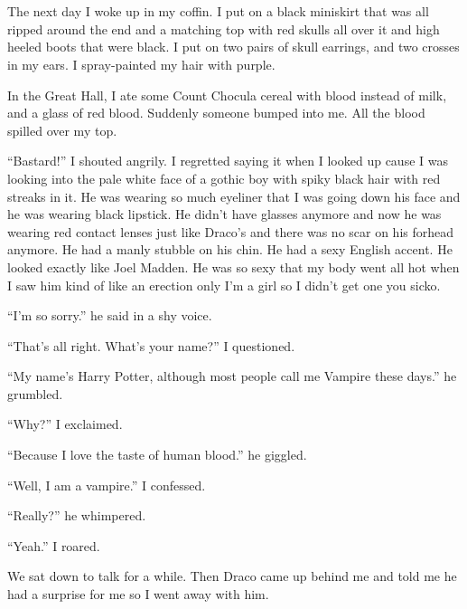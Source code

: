 \section{}



The next day I woke up in my coffin. I put on a black miniskirt that was all ripped around the end and a matching top with red skulls all over it and high heeled boots that were black. I put on two pairs of skull earrings, and two crosses in my ears. I spray-painted my hair with purple.

\begin{sloppypar}
    In the Great Hall, I ate some Count Chocula cereal with blood instead of milk, and a glass of red blood. Suddenly someone bumped into me. All the blood spilled over my top.
\end{sloppypar}

\enquote{Bastard!} I shouted angrily. I regretted saying it when I looked up cause I was looking into the pale white face of a gothic boy with spiky black hair with red streaks in it. He was wearing so much eyeliner that I was going down his face and he was wearing black lipstick. He didn't have glasses anymore and now he was wearing red contact lenses just like Draco's and there was no scar on his forhead anymore. He had a manly stubble on his chin. He had a sexy English accent. He looked exactly like Joel Madden. He was so sexy that my body went all hot when I saw him kind of like an erection only I'm a girl so I didn't get one you sicko.

\enquote{I'm so sorry.} he said in a shy voice.

\enquote{That's all right. What's your name?} I questioned.

\enquote{My name's Harry Potter, although most people call me Vampire these days.} he grumbled.

\enquote{Why?} I exclaimed.

\enquote{Because I love the taste of human blood.} he giggled.

\enquote{Well, I am a vampire.} I confessed.

\enquote{Really?} he whimpered.

\enquote{Yeah.} I roared.

We sat down to talk for a while. Then Draco came up behind me and told me he had a surprise for me so I went away with him.
